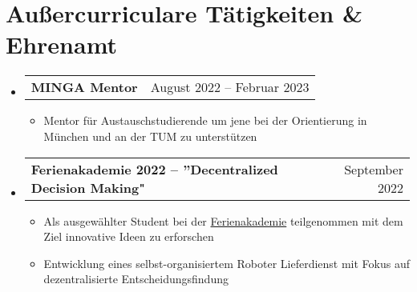\documentclass[letterpaper,11pt]{article}
\makeatletter
\newcommand{\resumeItem}[1]{
  \item\small{
    {#1 \vspace{-2pt}}
  }
}
\newcommand{\resumeProjectHeading}[2]{
    \item
    \begin{tabular*}{0.97\textwidth}{l@{\extracolsep{\fill}}r}
      \small#1 & #2 \\
    \end{tabular*}\vspace{-7pt}
}
\newcommand{\resumeSubHeadingListStart}{\begin{itemize}[leftmargin=0.15in, label={}]}
\newcommand{\resumeSubHeadingListEnd}{\end{itemize}}
\newcommand{\resumeItemListStart}{\begin{itemize}}
\newcommand{\resumeItemListEnd}{\end{itemize}\vspace{-5pt}}
\makeatother
\begin{document}


\section{Außercurriculare Tätigkeiten \& Ehrenamt}
\resumeSubHeadingListStart
\resumeProjectHeading
    {\textbf{MINGA Mentor} }{August 2022 -- Februar 2023}
    \resumeItemListStart
      \resumeItem{Mentor für Austauschstudierende um jene bei der Orientierung in München und an der TUM zu unterstützen}
    \resumeItemListEnd
\resumeProjectHeading
  {\textbf{Ferienakademie 2022 -- ”Decentralized Decision Making"}}{September 2022}
  \resumeItemListStart
    \resumeItem{Als ausgewählter Student bei der \href{https://ase.in.tum.de/lehrstuhl_1/projects/1193-ferienakademie-2022}{Ferienakademie} teilgenommen mit dem Ziel innovative Ideen zu erforschen}
    \resumeItem{Entwicklung eines selbst-organisiertem Roboter Lieferdienst mit Fokus auf dezentralisierte Entscheidungsfindung}
  \resumeItemListEnd
\resumeSubHeadingListEnd

\end{document}
